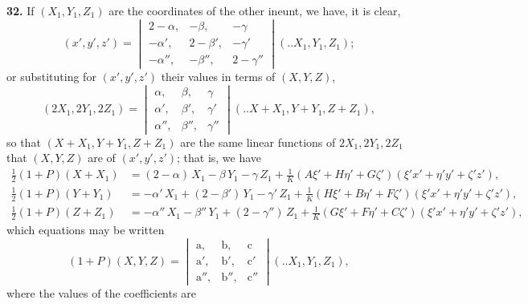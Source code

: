 \documentclass[12pt,a4paper]{article}
\newcommand{\qform}[2]{(#1 \mathbin{..} #2)}
\theoremstyle{definition}
\begin{document}
\textbf{32.} If $(X_{1}, Y_{1}, Z_{1})$ are the coordinates of the other ineunt, we have, it is clear,
\[
(x', y', z') =
\begin{vmatrix}
2-\alpha, & -\beta, & -\gamma \\
-\alpha', & 2-\beta', & -\gamma' \\
-\alpha'', & -\beta'', & 2-\gamma''
\end{vmatrix}
\!\qform{}{X_{1}, Y_{1}, Z_{1}};
\]
or substituting for $(x', y', z')$ their values in terms of $(X, Y, Z)$,
\[
(2X_{1}, 2Y_{1}, 2Z_{1}) =
\begin{vmatrix}
\alpha, & \beta, & \gamma \\
\alpha', & \beta', & \gamma' \\
\alpha'', & \beta'', & \gamma''
\end{vmatrix}
\!\qform{}{X+X_{1}, Y+Y_{1}, Z+Z_{1}},
\]
so that $(X+X_{1}, Y+Y_{1}, Z+Z_{1})$ are the same linear functions of $2X_{1}, 2Y_{1}, 2Z_{1}$ that $(X, Y, Z)$ are of $(x', y', z')$; that is, we have
\begin{align*}
\tfrac{1}{2}(1+P)(X+X_{1}) &= (2-\alpha)\,X_{1} - \beta\,Y_{1} - \gamma\,Z_{1}
+ \tfrac{1}{K}(A\xi' + H\eta' + G\zeta')(\xi'x' + \eta'y' + \zeta'z'),\\
\tfrac{1}{2}(1+P)(Y+Y_{1}) &= -\alpha'\,X_{1} + (2-\beta')\,Y_{1} - \gamma'\,Z_{1}
+ \tfrac{1}{K}(H\xi' + B\eta' + F\zeta')(\xi'x' + \eta'y' + \zeta'z'),\\
\tfrac{1}{2}(1+P)(Z+Z_{1}) &= -\alpha''\,X_{1} - \beta''\,Y_{1} + (2-\gamma'')\,Z_{1}
+ \tfrac{1}{K}(G\xi' + F\eta' + C\zeta')(\xi'x' + \eta'y' + \zeta'z'),
\end{align*}
which equations may be written
\[
(1+P)(X, Y, Z) =
\begin{vmatrix}
\mathrm{a}, & \mathrm{b}, & \mathrm{c} \\
\mathrm{a}', & \mathrm{b}', & \mathrm{c}' \\
\mathrm{a}'', & \mathrm{b}'', & \mathrm{c}''
\end{vmatrix}
\!\qform{}{X_{1}, Y_{1}, Z_{1}},
\]
where the values of the coefficients are
\end{document}
